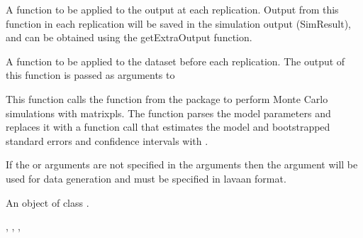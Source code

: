 \documentclass[a4paper]{book}
\begin{document}
\begin{Arguments}
\begin{ldescription}
\item[\code{outfun}] A function to be applied to the   output at each replication. 
Output from this function in each replication will be saved in the simulation 
output (SimResult), and can be obtained using the getExtraOutput function.

\item[\code{prefun}] A function to be applied to the dataset before each replication. The output of this
function is passed as arguments to 
\end{ldescription}
\end{Arguments}
%
\begin{Details}\relax
This function calls the  function from the  package to perform Monte
Carlo simulations with matrixpls. The function parses the model parameters and replaces it with
a function call that estimates the model and bootstrapped standard errors and confidence
intervals with .

If the  or  arguments are not specified in the  arguments
then the  argument will be used for data generation and must be specified in lavaan format.
\end{Details}
%
\begin{Value}
An object of class .
\end{Value}
%
\begin{SeeAlso}\relax
{}, , , 
\end{SeeAlso}
%
\end{document}
